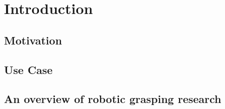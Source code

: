 \pagebreak
\section{Introduction}

\subsection{Motivation}

\subsection{Use Case}

\subsection{An overview of robotic grasping research}

